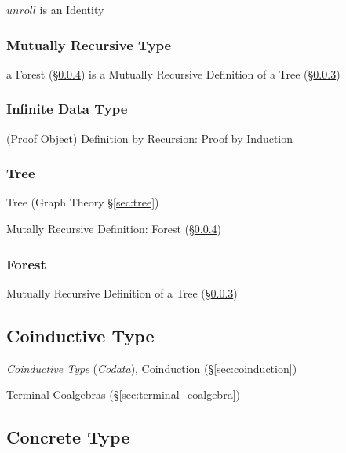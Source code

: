 $unroll$ is an Identity



\subsubsection{Mutually Recursive Type}
\label{sec:mutually_recursive}\hfill

a Forest (\S\ref{sec:forest_type}) is a Mutually Recursive Definition
of a Tree (\S\ref{sec:tree_type})



\subsubsection{Infinite Data Type}\label{sec:infinite_datatype}

(Proof Object) Definition by Recursion: Proof by Induction



\subsubsection{Tree}\label{sec:tree_type}

Tree (Graph Theory \S\ref{sec:tree})

Mutally Recursive Definition: Forest (\S\ref{sec:forest_type})



\subsubsection{Forest}\label{sec:forest_type}

Mutually Recursive Definition of a Tree (\S\ref{sec:tree_type})



\subsection{Coinductive Type}\label{sec:coinductive_type}

\emph{Coinductive Type} (\emph{Codata}), Coinduction
(\S\ref{sec:coinduction})

Terminal Coalgebras (\S\ref{sec:terminal_coalgebra})



\subsection{Concrete Type}\label{sec:concrete_type}

